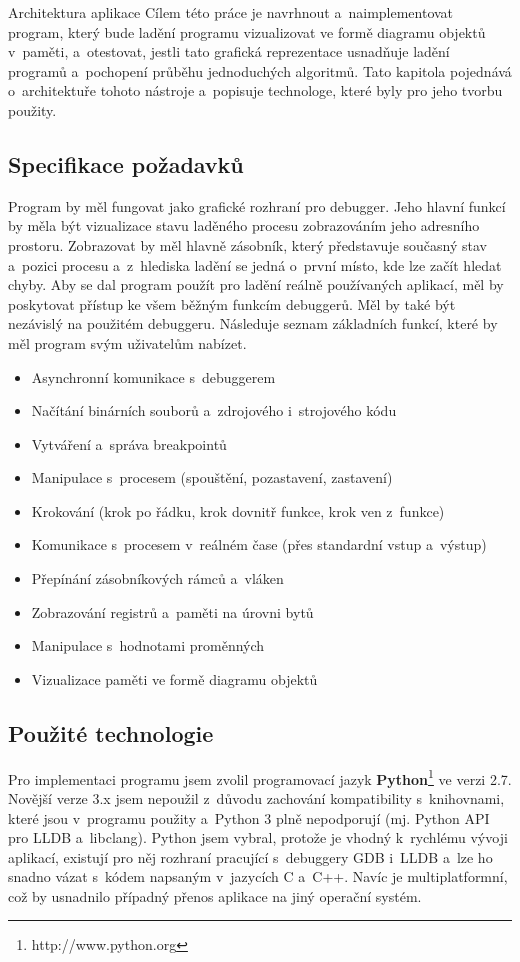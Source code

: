 \documentclass[czech,bachelor,male,python,dept460,hidelinks]{diploma}						%
\begin{document}
\begin{section}{Architektura aplikace}
\label{sec:DeviArchitecture}
  Cílem této práce je navrhnout a~naimplementovat program, který bude ladění programu vizualizovat ve formě diagramu objektů v~paměti, a~otestovat,
	jestli tato grafická reprezentace usnadňuje ladění programů a~pochopení průběhu jednoduchých algoritmů.
	Tato kapitola pojednává o~architektuře tohoto nástroje a~popisuje technologe, které byly pro jeho tvorbu použity.
	
	\subsection{Specifikace požadavků}
	Program by měl fungovat jako grafické rozhraní pro debugger. Jeho hlavní funkcí by měla být vizualizace stavu laděného procesu zobrazováním jeho
	adresního prostoru. Zobrazovat by měl hlavně zásobník, který představuje současný stav a~pozici procesu a~z~hlediska ladění se jedná o~první místo,
	kde lze začít hledat chyby.
	Aby se dal program použít pro ladění reálně používaných aplikací, měl by poskytovat přístup ke všem běžným
	funkcím debuggerů. Měl by také být nezávislý na použitém debuggeru. Následuje seznam základních funkcí, které by měl program svým uživatelům nabízet.
	
	\begin{itemize}
		\item Asynchronní komunikace s~debuggerem
		\item Načítání binárních souborů a~zdrojového i~strojového kódu
		\item Vytváření a~správa breakpointů
		\item Manipulace s~procesem (spouštění, pozastavení, zastavení)
		\item Krokování (krok po řádku, krok dovnitř funkce, krok ven z~funkce)
		\item Komunikace s~procesem v~reálném čase (přes standardní vstup a~výstup)
		\item Přepínání zásobníkových rámců a~vláken
		\item Zobrazování registrů a~paměti na úrovni bytů
		\item Manipulace s~hodnotami proměnných
		\item Vizualizace paměti ve formě diagramu objektů
	\end{itemize}
	
	\subsection{Použité technologie}
	\par Pro implementaci programu jsem zvolil programovací jazyk \textbf{Python}\footnote{http://www.python.org} ve verzi 2.7. Novější verze 3.x jsem nepoužil
	z~důvodu zachování kompatibility s~knihovnami, které jsou v~programu použity a~Python 3 plně nepodporují (mj. Python API pro LLDB a~libclang).
	Python jsem vybral, protože je vhodný k~rychlému vývoji aplikací, existují pro něj rozhraní pracující s~debuggery GDB i~LLDB a~lze ho snadno vázat
	s~kódem napsaným v~jazycích C a~C++. Navíc je multiplatformní, což by usnadnilo případný přenos aplikace na jiný operační systém.
	

\end{section}
\end{document}
